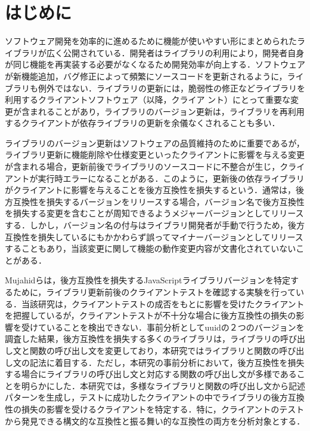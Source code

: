 \documentclass[T,J]{fose} %
\begin{document}
\section{はじめに}

ソフトウェア開発を効率的に進めるために機能が使いやすい形にまとめられたライブラリが広く公開されている．開発者はライブラリの利用により，開発者自身が同じ機能を再実装する必要がなくなるため開発効率が向上する\cite{konstantopoulos2009best}\cite{Moser1996effect}．ソフトウェアが新機能追加，バグ修正によって頻繁にソースコードを更新されるように，ライブラリも例外ではない\cite{raemaekers2012measuring}．ライブラリの更新には，脆弱性の修正などライブラリを利用するクライアントソフトウェア（以降，クライア
ント）にとって重要な変更が含まれることがあり，ライブラリのバージョン更新は，ライブラリを再利用するクライアントが依存ライブラリの更新を余儀なくされることも多い．

ライブラリのバージョン更新はソフトウェアの品質維持のために重要であるが，ライブラリ更新に機能削除や仕様変更といったクライアントに影響を与える変更が含まれる場合，更新前後でライブラリのソースコードに不整合が生じ，クライアントが実行時エラーになることがある．このように，更新後の依存ライブラリがクライアントに影響を与えることを後方互換性を損失するという．通常は，後方互換性を損失するバージョンをリリースする場合，バージョン名で後方互換性を損失する変更を含むことが周知できるようメジャーバージョンとしてリリースする．しかし，バージョン名の付与はライブラリ開発者が手動で行うため，後方互換性を損失しているにもかかわらず誤ってマイナーバージョンとしてリリースすることもあり，当該変更に関して機能の動作変更内容が文書化されていないことがある\cite{mostafa2017experience}．

Mujahidらは，後方互換性を損失するJavaScriptライブラリバージョンを特定するために，ライブラリ更新前後のクライアントテストを確認する実験を行っている\cite{mujahid}．当該研究は，クライアントテストの成否をもとに影響を受けたクライアントを把握しているが，クライアントテストが不十分な場合に後方互換性の損失の影響を受けていることを検出できない．事前分析としてuuidの２つのバージョンを調査した結果，後方互換性を損失する多くのライブラリは，ライブラリの呼び出し文と関数の呼び出し文を変更しており，本研究ではライブラリと関数の呼び出し文の記法に着目する．ただし，本研究の事前分析において，後方互換性を損失する場合にライブラリの呼び出し文と対応する関数の呼び出し文が多様であることを明らかにした．本研究では，多様なライブラリと関数の呼び出し文から記述パターンを生成し，テストに成功したクライアントの中でライブラリの後方互換性の損失の影響を受けるクライアントを特定する．特に，クライアントのテストから発見できる構文的な互換性と振る舞い的な互換性の両方を分析対象とする．
\end{document}
